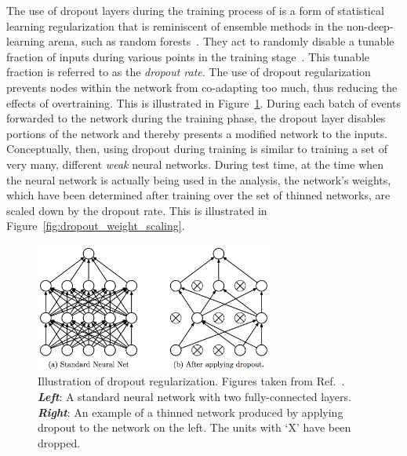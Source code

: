 The use of dropout layers during the training process of is a form of statistical learning regularization that is reminiscent
of ensemble methods in the non-deep-learning arena, such as random forests~\cite{RandomForestsBreiman2001}.
They act to randomly disable a tunable fraction of inputs during various points in the training stage~\cite{JMLRDropout}.
This tunable fraction is referred to as the \textit{dropout rate}.
The use of dropout regularization prevents nodes within the network from co-adapting too much, thus reducing
the effects of overtraining.
This is illustrated in Figure~\ref{fig:dropout_illustration}.
During each batch of events forwarded to the network during the training phase, the dropout layer disables
portions of the network and thereby presents a modified network to the inputs.
Conceptually, then, using dropout during training is similar to training a set of very many, different \textit{weak}
neural networks.
During test time, at the time when the neural network is actually being used in the analysis,
the network's weights, which have been determined after training over the set of thinned networks,
are scaled down by the dropout rate.
This is illustrated in Figure~\ref{fig:dropout_weight_scaling}.

\begin{figure}[!htb]
    \begin{center}
        \includegraphics[width=0.7\textwidth]{figures/search_hh/mva/dropout_illustration}
        \caption{
            Illustration of dropout regularization. Figures taken from Ref.~\cite{JMLRDropout}.
            \textit{\textbf{Left}}: A standard neural network with two fully-connected layers.
            \textit{\textbf{Right}}: An example of a thinned network produced by applying dropout to the
                network on the left.
                The units with `X' have been dropped.
        }
        \label{fig:dropout_illustration}
    \end{center}
\end{figure}

